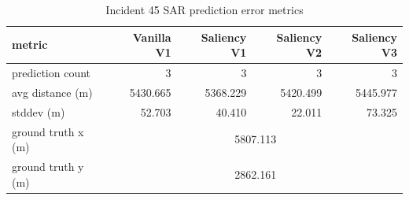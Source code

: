 \begin{table}[ht]
\centering
\caption{Incident 45 SAR prediction error metrics}
\label{tab:sar-incident-45}
\begin{tabular}{lrrrr}
\hline
metric & Vanilla V1 & Saliency V1 & Saliency V2 & Saliency V3 \\
\hline
prediction count & 3 & 3 & 3 & 3 \\
avg distance (m) & 5430.665 & 5368.229 & 5420.499 & 5445.977 \\
stddev (m) & 52.703 & 40.410 & 22.011 & 73.325 \\
ground truth x (m) & \multicolumn{4}{c}{5807.113} \\
ground truth y (m) & \multicolumn{4}{c}{2862.161} \\
\hline
\end{tabular}
\end{table}
